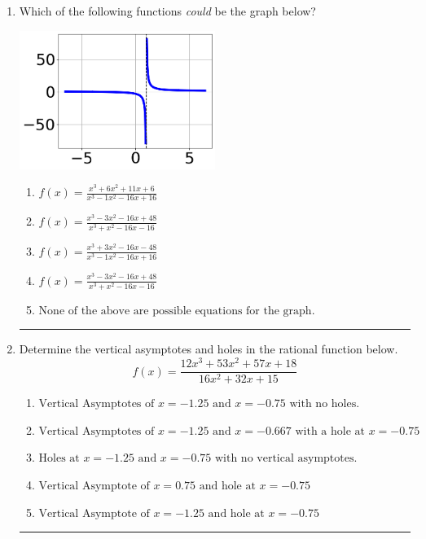 \documentclass[14pt]{extbook}
\newcommand{\litem}[1]{\item#1\hspace*{-1cm}\rule{\textwidth}{0.4pt}}
\begin{document}
\begin{enumerate}
{\begin{enumerate}[label=\Alph*.]
\end{enumerate} }
\litem{
Which of the following functions \textit{could} be the graph below?
\begin{center}
    \includegraphics[width=0.5\textwidth]{../Figures/identifyGraphOfRationalFunctionCopyA.png}
\end{center}
\begin{enumerate}[label=\Alph*.]
\item \( f(x)=\frac{x^{3} +6 x^{2} +11 x + 6}{x^{3} -1 x^{2} -16 x + 16} \)
\item \( f(x)=\frac{x^{3} -3 x^{2} -16 x + 48}{x^{3} + x^{2} -16 x -16} \)
\item \( f(x)=\frac{x^{3} +3 x^{2} -16 x -48}{x^{3} -1 x^{2} -16 x + 16} \)
\item \( f(x)=\frac{x^{3} -3 x^{2} -16 x + 48}{x^{3} + x^{2} -16 x -16} \)
\item \( \text{None of the above are possible equations for the graph.} \)

\end{enumerate} }
\litem{
Determine the vertical asymptotes and holes in the rational function below.\[ f(x) = \frac{12x^{3} +53 x^{2} +57 x + 18}{16x^{2} +32 x + 15} \]\begin{enumerate}[label=\Alph*.]
\item \( \text{Vertical Asymptotes of } x = -1.25 \text{ and } x = -0.75 \text{ with no holes.} \)
\item \( \text{Vertical Asymptotes of } x = -1.25 \text{ and } x = -0.667 \text{ with a hole at } x = -0.75 \)
\item \( \text{Holes at } x = -1.25 \text{ and } x = -0.75 \text{ with no vertical asymptotes.} \)
\item \( \text{Vertical Asymptote of } x = 0.75 \text{ and hole at } x = -0.75 \)
\item \( \text{Vertical Asymptote of } x = -1.25 \text{ and hole at } x = -0.75 \)

\end{enumerate} }
\end{enumerate}
\end{document}
